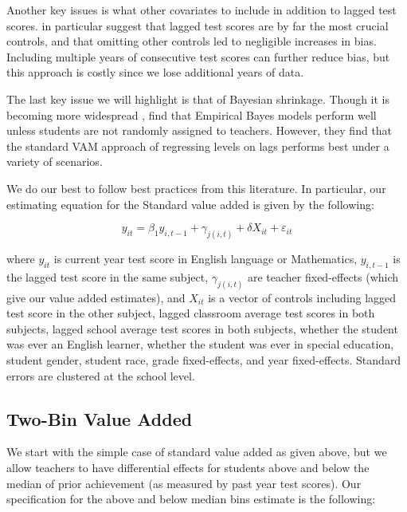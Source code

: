 \documentclass[letterpaper,12pt]{article}
\begin{document}
Another key issues is what other covariates to include in addition to lagged test scores. \cite{chetty2014measuring1} in particular suggest that lagged test scores are by far the most crucial controls, and that omitting other controls led to negligible increases in bias. Including multiple years of consecutive test scores can further reduce bias, but this approach is costly since we lose additional years of data.

The last key issue we will highlight is that of Bayesian shrinkage. Though it is becoming more widespread \citep{Koedel2015}, \cite{guarino2015evaluation} find that Empirical Bayes models perform well unless students are not randomly assigned to teachers. However, they find that the standard VAM approach of regressing levels on lags performs best under a variety of scenarios.

We do our best to follow best practices from this literature. In particular, our estimating equation for the Standard value added is given by the following:

    \begin{equation}\label{eq: standard}
        y_{it} = \beta_1 y_{i,t-1} + \gamma_{j(i,t)} + \delta X_{it} + \varepsilon_{it}
    \end{equation}
    
\noindent where $y_{it}$ is current year test score in English language or Mathematics, $y_{i,t-1}$ is the lagged test score in the same subject, $\gamma_{j(i,t)}$ are teacher fixed-effects (which give our value added estimates), and $X_{it}$ is a vector of controls including lagged test score in the other subject, lagged classroom average test scores in both subjects, lagged school average test scores in both subjects, whether the student was ever an English learner, whether the student was ever in special education, student gender, student race, grade fixed-effects, and year fixed-effects. Standard errors are clustered at the school level.




\subsection{Two-Bin Value Added}

We start with the simple case of standard value added as given above, but we allow teachers to have differential effects for students above and below the median of prior achievement (as measured by past year test scores). Our specification for the above and below median bins estimate is the following:
\end{document}

